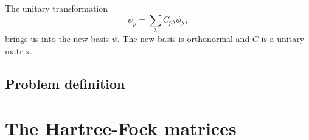 \documentclass{article}
\begin{document}
The unitary transformation
\begin{equation*}
    \psi_p  = \sum_{\lambda} C_{p\lambda}\phi_{\lambda},
\end{equation*}
brings us into the new basis $\psi$.
The new basis is orthonormal and $C$ is a unitary matrix.

\subsection*{Problem definition}


\section{The Hartree-Fock matrices}

\end{document}
